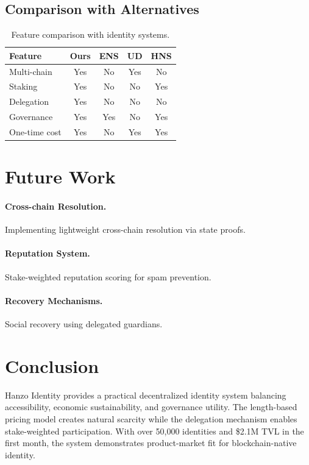 \documentclass[11pt,twocolumn]{article}
\begin{document}
\subsection{Comparison with Alternatives}

\begin{table}[h]
\centering
\caption{Feature comparison with identity systems.}
\label{tab:compare}
\begin{tabular}{lcccc}
\toprule
\textbf{Feature} & \textbf{Ours} & \textbf{ENS} & \textbf{UD} & \textbf{HNS} \\
\midrule
Multi-chain & Yes & No & Yes & No \\
Staking & Yes & No & No & Yes \\
Delegation & Yes & No & No & No \\
Governance & Yes & Yes & No & Yes \\
One-time cost & Yes & No & Yes & Yes \\
\bottomrule
\end{tabular}
\end{table}

\section{Future Work}

\paragraph{Cross-chain Resolution.} Implementing lightweight cross-chain resolution via state proofs.

\paragraph{Reputation System.} Stake-weighted reputation scoring for spam prevention.

\paragraph{Recovery Mechanisms.} Social recovery using delegated guardians.

\section{Conclusion}

Hanzo Identity provides a practical decentralized identity system balancing accessibility, economic sustainability, and governance utility. The length-based pricing model creates natural scarcity while the delegation mechanism enables stake-weighted participation. With over 50,000 identities and \$2.1M TVL in the first month, the system demonstrates product-market fit for blockchain-native identity.
\end{document}

